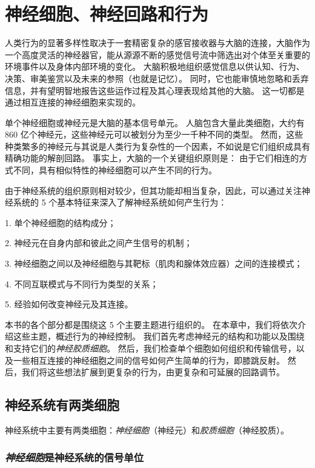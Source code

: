 \chapter{神经细胞、神经回路和行为} \label{chap:chap3}



人类行为的显著多样性取决于一套精密复杂的感官接收器与大脑的连接，大脑作为一个高度灵活的神经器官，能从源源不断的感觉信号流中筛选出对个体至关重要的环境事件以及身体内部环境的变化。
大脑积极地组织感觉信息以供认知、行为、决策、审美鉴赏以及未来的参照（也就是记忆）。
同时，它也能审慎地忽略和丢弃信息，并有望明智地报告这些运作过程及其心理表现给其他的大脑。
这一切都是通过相互连接的神经细胞来实现的。


单个神经细胞或神经元是大脑的基本信号单元。 
人脑包含大量此类细胞，大约有 860 亿个神经元，这些神经元可以被划分为至少一千种不同的类型。 
然而，这些种类繁多的神经元与其说是人类行为复杂性的一个因素，不如说是它们组织成具有精确功能的解剖回路。 
事实上，大脑的一个关键组织原则是：
由于它们相连的方式不同，具有相似特性的神经细胞可以产生不同的行为。


由于神经系统的组织原则相对较少，但其功能却相当复杂，因此，可以通过关注神经系统的 5 个基本特征来深入了解神经系统如何产生行为：

1. 单个神经细胞的结构成分；

2. 神经元在自身内部和彼此之间产生信号的机制；

3. 神经细胞之间以及神经细胞与其靶标（肌肉和腺体效应器）之间的连接模式；

4. 不同互联模式与不同行为类型的关系；

5. 经验如何改变神经元及其连接。


本书的各个部分都是围绕这 5 个主要主题进行组织的。
在本章中，我们将依次介绍这些主题，概述行为的神经控制。
我们首先考虑神经元的结构和功能以及围绕和支持它们的\textit{神经胶质细胞}。
然后，我们检查单个细胞如何组织和传输信号，以及一些相互连接的神经细胞之间的信号如何产生简单的行为，即膝跳反射。
然后，我们将这些想法扩展到更复杂的行为，由更复杂和可延展的回路调节。



\section{神经系统有两类细胞}

神经系统中主要有两类细胞：\textit{神经细胞}（神经元）和\textit{胶质细胞}（神经胶质）。


\subsection{\textit{神经细胞}是神经系统的信号单位}

